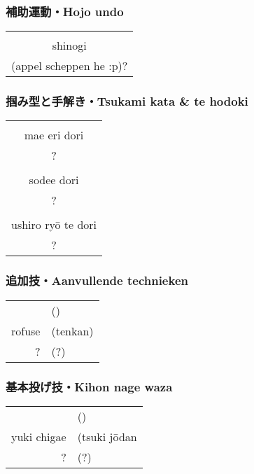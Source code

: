 \subsubsection{補助運動・Hojo undo}
\begin{table}[H]
\begin{center}
\begin{tabular}{c}
    \ruby{}{}\ruby{}{}\\
    shinogi\\
    (appel scheppen he :p)?
\end{tabular}
\end{center}
\label{kyuu_4_hojo_undo}
\end{table}

\subsubsection{掴み型と手解き・Tsukami kata \& te hodoki}
\begin{table}[H]
\begin{center}
\begin{tabular}{c}
    \ruby{}{}\ruby{}{}\\
    mae eri dori\\
    ?\\
    \hline
    \ruby{}{}\\
    sodee dori\\
    ?\\
    \hline
    \ruby{}{}\\
    ushiro ry\={o} te dori\\
    ?
\end{tabular}
\end{center}
\label{kyuu_4_te_hodoki}
\end{table}

\subsubsection{追加技・Aanvullende technieken}
\begin{table}[H]
\begin{center}
\begin{tabular}{rl}
    \ruby{}{}\ruby{}{} & (\ruby{}{})\\
    rofuse & (tenkan)\\
    ? & (?)
\end{tabular}
\end{center}
\label{kyuu_4_additional}
\end{table}

\subsubsection{基本投げ技・Kihon nage waza}
\begin{table}[H]
\begin{center}
\begin{tabular}{rl}
    \ruby{}{}\ruby{}{} & (\ruby{}{})\\
    yuki chigae & (tsuki j\={o}dan})\\
    ? & (?)
\end{tabular}
\end{center}
\label{kyuu_4_kihon_nage_waza}
\end{table}

